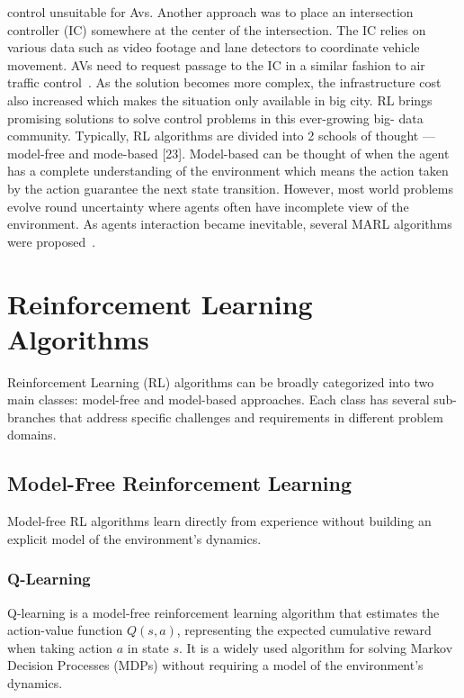 control unsuitable for Avs.
Another approach was to place an
intersection controller (IC) somewhere at the center of the
intersection.
The IC relies on various data such as video
footage and lane detectors to coordinate vehicle movement.
AVs need to request passage to the IC in a similar fashion to
air traffic control~\cite{li2021planning, gunarathna2022intelligent, qian2017autonomous, chen2019intersection}.
As the solution becomes more
complex, the infrastructure cost also increased which makes
the situation only available in big city.
RL brings promising
solutions to solve control problems in this ever-growing big-
data community.
Typically, RL algorithms are divided into 2
schools of thought — model-free and mode-based [23].
Model-based can be thought of when the agent has a complete
understanding of the environment which means the action
taken by the action guarantee the next state transition.
However, most world problems evolve round uncertainty
where agents often have incomplete view of the environment.
As agents interaction became inevitable, several MARL
algorithms were proposed~\cite{peng2021learning, yang2018mean, johanson2021emergent, tang2020towards, oroojlooyjadid2019review, siekmann1998agent, zhou2020smarts, zhang2019multiagent}.
\section{Reinforcement Learning Algorithms}

Reinforcement Learning (RL) algorithms can be broadly categorized into two main classes: model-free and model-based approaches. Each class has several sub-branches that address specific challenges and requirements in different problem domains.

\subsection{Model-Free Reinforcement Learning}\label{subsec:model-free-reinforcement-learning}

Model-free RL algorithms learn directly from experience without building an explicit model of the environment's dynamics.

\subsubsection{Q-Learning}\label{subsubsec:q-learning}

Q-learning is a model-free reinforcement learning algorithm that estimates the action-value function \(Q(s, a)\), representing the expected cumulative reward when taking action \(a\) in state \(s\). It is a widely used algorithm for solving Markov Decision Processes (MDPs) without requiring a model of the environment's dynamics.

